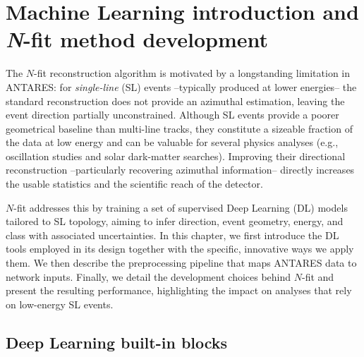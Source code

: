 \chapter[Machine Learning introduction and \emph{N}-fit method development]{Machine Learning introduction and \emph{N}-fit method development}
\label{chap:ml}




The $N$-fit reconstruction algorithm is motivated by a longstanding limitation in ANTARES: for \emph{single-line} (SL) events --typically produced at lower energies-- the standard reconstruction does not provide an azimuthal estimation, leaving the event direction partially unconstrained. Although SL events provide a poorer geometrical baseline than multi-line tracks, they constitute a sizeable fraction of the data at low energy and can be valuable for several physics analyses (e.g., oscillation studies and solar dark-matter searches). Improving their directional reconstruction --particularly recovering azimuthal information-- directly increases the usable statistics and the scientific reach of the detector.

$N$-fit addresses this by training a set of supervised Deep Learning (DL) models tailored to SL topology, aiming to infer direction, event geometry, energy, and class with associated uncertainties. In this chapter, we first introduce the DL tools employed in its design together with the specific, innovative ways we apply them. We then describe the preprocessing pipeline that maps ANTARES data to network inputs. Finally, we detail the development choices behind $N$-fit and present the resulting performance, highlighting the impact on analyses that rely on low-energy SL events.


\section{Deep Learning built-in blocks}
\label{sec:N-fit}

